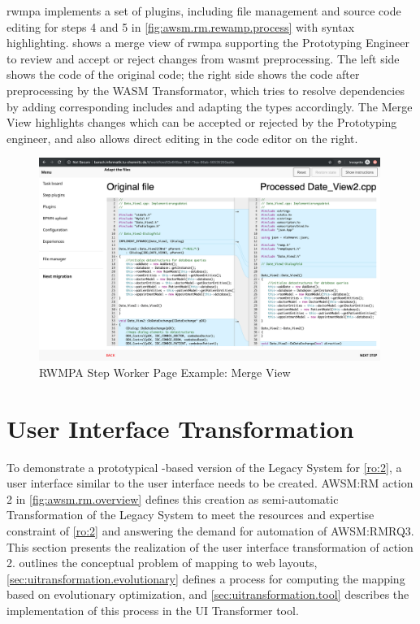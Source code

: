 \gls{rwmpa} implements a set of plugins, including file management and source code editing for steps 4 and 5 in \cref{fig:awsm.rm.rewamp.process} with syntax highlighting.
 shows a merge view of \gls{rwmpa} supporting the Prototyping Engineer to review and accept or reject changes from \gls{wasmt} preprocessing.
The left side shows the code of the original  code; the right side shows the code after preprocessing by the WASM Transformator, which tries to resolve dependencies by adding corresponding includes and adapting the types accordingly.
The Merge View highlights changes which can be accepted or rejected by the Prototyping engineer, and also allows direct editing in the code editor on the right.
\begin{figure}[h]
\hypertarget{fig:awsm.rm.rwmpa.screenshot}{%
\centering
\includegraphics[width=0.99\textwidth]{../figures/screenshots/rwmpa-review-preprocessing.png}
\caption{RWMPA Step Worker Page Example: Merge View}\label{fig:awsm.rm.rwmpa.screenshot}
}
\end{figure}

\vspace{-15pt}
\hypertarget{sec:uitransformation}{%
\section{User Interface Transformation}\label{sec:uitransformation}}
\vspace{15pt}
To demonstrate a prototypical -based version of the \gls{Legacy System} for \cref{ro:2}, a  user interface similar to the \legacy user interface needs to be created.
AWSM:RM action 2 in \cref{fig:awsm.rm.overview} defines this creation as semi-automatic \gls{Transformation} of the \gls{Legacy System} to meet the resources and expertise constraint of \cref{ro:2} and answering the demand for automation of AWSM:RMRQ3.
This section presents the realization of the user interface transformation of action 2.
 outlines the conceptual problem of mapping \legacy to \gls{web} layouts, \cref{sec:uitransformation.evolutionary} defines a process for computing the mapping based on evolutionary optimization, and \cref{sec:uitransformation.tool} describes the implementation of this process in the UI Transformer tool.

